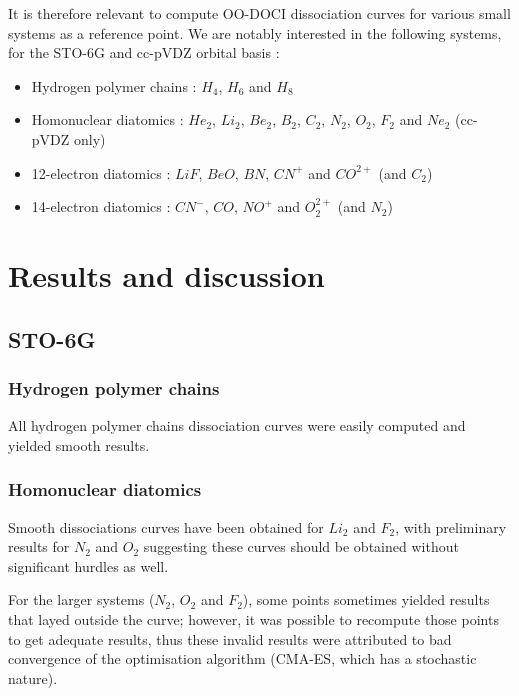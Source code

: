 \documentclass[twoside,twocolumn,9pt]{article}
\begin{document}
It is therefore relevant to compute OO-DOCI dissociation curves for various small systems as a reference point. We are notably interested in the following systems, for the STO-6G and cc-pVDZ orbital basis :

\begin{itemize}
    \item Hydrogen polymer chains : $H_4$, $H_6$ and $H_8$ 
    \item Homonuclear diatomics : $He_2$, $Li_2$, $Be_2$, $B_2$, $C_2$, $N_2$, $O_2$, $F_2$ and $Ne_2$ (cc-pVDZ only)
    \item 12-electron diatomics : 
    $LiF$, $BeO$, $BN$, $CN^+$ and $CO^{2+}$ (and $C_2$)
    \item 14-electron diatomics : 
    $CN^-$, $CO$, $NO^+$ and $O_2^{2+}$ (and $N_2$)
\end{itemize}


\section{Results and discussion}
\subsection{STO-6G}
\subsubsection{Hydrogen polymer chains}
All hydrogen polymer chains dissociation curves were easily computed and yielded smooth results. 


\subsubsection{Homonuclear diatomics}
Smooth dissociations curves have been obtained for $Li_2$ and $F_2$, with preliminary results for $N_2$ and $O_2$ suggesting these curves should be obtained without significant hurdles as well.

For the larger systems ($N_2$, $O_2$ and $F_2$), some points sometimes yielded results that layed outside the curve; however, it was possible to recompute those points to get adequate results, thus these invalid results were attributed to bad convergence of the optimisation algorithm (CMA-ES, which has a stochastic nature).
\end{document}
